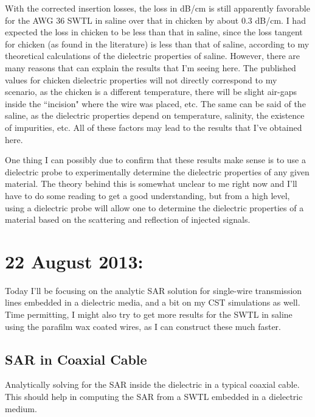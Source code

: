 \documentclass[12pt,onecolumn,titlepage]{article}
\begin{document}
With the corrected insertion losses, the loss in dB/cm is still apparently favorable for the AWG 36 SWTL in saline over that in chicken by about 0.3 dB/cm. I had expected the loss in chicken to be less than that in saline, since the loss tangent for chicken (as found in the literature) is less than that of saline, according to my theoretical calculations of the dielectric properties of saline. However, there are many reasons that can explain the results that I'm seeing here. The published values for chicken dielectric properties will not directly correspond to my scenario, as the chicken is a different temperature, there will be slight air-gaps inside the ``incision" where the wire was placed, etc. The same can be said of the saline, as the dielectric properties depend on temperature, salinity, the existence of impurities, etc. All of these factors may lead to the results that I've obtained here. 

One thing I can possibly due to confirm that these results make sense is to use a dielectric probe to experimentally determine the dielectric properties of any given material. The theory behind this is somewhat unclear to me right now and I'll have to do some reading to get a good understanding, but from a high level, using a dielectric probe will allow one to determine the dielectric properties of a material based on the scattering and reflection of injected signals.





\clearpage
\section{22 August 2013:}

\indent \indent Today I'll be focusing on the analytic SAR solution for single-wire transmission lines embedded in a dielectric media, and a bit on my CST simulations as well. Time permitting, I might also try to get more results for the SWTL in saline using the parafilm wax coated wires, as I can construct these much faster.



\subsection{SAR in Coaxial Cable}
\indent \indent Analytically solving for the SAR inside the dielectric in a typical coaxial cable. This should help in computing the SAR from a SWTL embedded in a dielectric medium.
\end{document}
